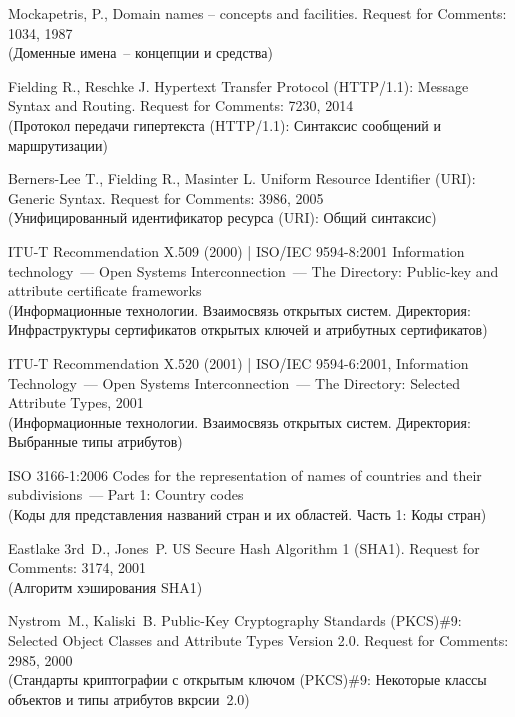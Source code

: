 \clearpage
\renewcommand{\bibname}{Библиография}
\begin{thebibliography}{9}

Mockapetris, P., Domain names -- concepts and facilities. 
Request for Comments: 1034, 1987\\ 
{\small (Доменные имена~-- концепции и средства)} 

Fielding R., Reschke J.
Hypertext Transfer Protocol (HTTP/1.1): Message Syntax and Routing. 
Request for Comments: 7230, 2014\\ 
{\small (Протокол передачи гипертекста (HTTP/1.1): Синтаксис сообщений и 
маршрутизации)}

Berners-Lee T., Fielding R., Masinter L. 
Uniform Resource Identifier (URI): Generic Syntax.  
Request for Comments: 3986, 2005\\
{\small (Унифицированный идентификатор ресурса (URI): Общий синтаксис)}

ITU-T Recommendation X.509 (2000) | ISO/IEC 9594-8:2001
Information technology~--- Open Systems Interconnection~--- 
The Directory: Public-key and attribute certificate frameworks\\
{\small (Информационные технологии. Взаимосвязь открытых систем.
Директория: Инфраструктуры сертификатов открытых ключей и атрибутных 
сертификатов)} 

ITU-T Recommendation X.520 (2001) | ISO/IEC 9594-6:2001,
Information Technology~--- Open Systems Interconnection~---
The Directory: Selected Attribute Types, 2001\\
{\small (Информационные технологии. Взаимосвязь открытых систем.
Директория: Выбранные типы атрибутов)}

ISO 3166-1:2006 Codes for the representation of names of countries and 
their subdivisions~--- Part 1: Country codes\\
{\small (Коды для представления названий стран и их областей. Часть 1: 
Коды стран)} 

Eastlake 3rd~D., Jones~P.
US Secure Hash Algorithm 1 (SHA1). 
Request for Comments: 3174, 2001\\   
{\small (Алгоритм хэширования SHA1)}

Nystrom~M., Kaliski~B. 
Public-Key Cryptography Standards (PKCS)\#9: 
Selected Object Classes and Attribute Types Version 2.0. Request for 
Comments: 2985, 2000\\ 
{\small (Стандарты криптографии с открытым ключом (PKCS)\#9: 
Некоторые классы объектов и типы атрибутов вкрсии~2.0)}  


\end{thebibliography}

